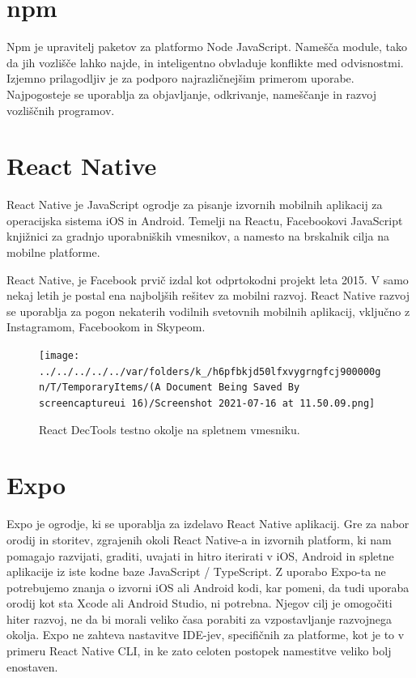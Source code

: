 \documentclass[a4paper, 12pt]{book}
\begin{document}
\section{npm}
Npm je upravitelj paketov za platformo Node JavaScript. Namešča module, tako da jih vozlišče lahko najde, in inteligentno obvladuje konflikte med odvisnostmi. Izjemno prilagodljiv je za podporo najrazličnejšim primerom uporabe. Najpogosteje se uporablja za objavljanje, odkrivanje, nameščanje in razvoj vozliščnih programov.~\cite{npm}

\section{React Native}
React Native je JavaScript ogrodje za pisanje izvornih mobilnih aplikacij za operacijska sistema iOS in Android. Temelji na Reactu, Facebookovi JavaScript knjižnici za gradnjo uporabniških vmesnikov, a namesto na brskalnik cilja na mobilne platforme. 

React Native, je Facebook prvič izdal kot odprtokodni projekt leta 2015. V samo nekaj letih je postal ena najboljših rešitev za mobilni razvoj. React Native razvoj se uporablja za pogon nekaterih vodilnih svetovnih mobilnih aplikacij, vključno z Instagramom, Facebookom in Skypeom.~\cite{RN}

\begin{figure}[htbp]
\begin{center}
\texttt{[image: ../../../../../var/folders/k\_/h6pfbkjd50lfxvygrngfcj900000gn/T/TemporaryItems/(A Document Being Saved By screencaptureui 16)/Screenshot 2021-07-16 at 11.50.09.png]}
\end{center}
\caption{React DecTools testno okolje na spletnem vmesniku.}
\label{reactDevTools}
\end{figure}

\section{Expo}
Expo je ogrodje, ki se uporablja za izdelavo React Native aplikacij. Gre za nabor orodij in storitev, zgrajenih okoli React Native-a in izvornih platform, ki nam pomagajo razvijati, graditi, uvajati in hitro iterirati v iOS, Android in spletne aplikacije iz iste kodne baze JavaScript / TypeScript. Z uporabo Expo-ta ne potrebujemo znanja o izvorni iOS ali Android kodi, kar pomeni, da tudi uporaba orodij kot sta Xcode ali Android Studio, ni potrebna. Njegov cilj je omogočiti hiter razvoj, ne da bi morali veliko časa porabiti za vzpostavljanje razvojnega okolja. Expo ne zahteva nastavitve IDE-jev, specifičnih za platforme, kot je to v primeru React Native CLI, in ke zato celoten postopek namestitve veliko bolj enostaven.~\cite{EXPO}
\end{document}
